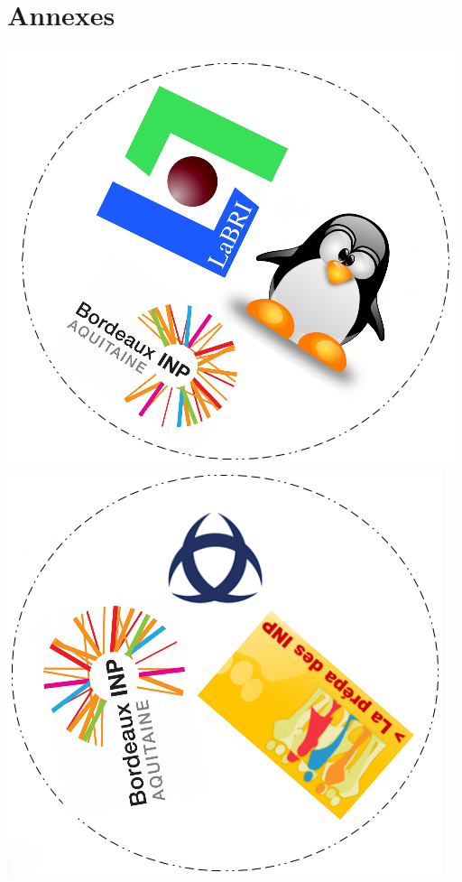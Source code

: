 \documentclass[a4paper]{article}
\begin{document}
\section*{Annexes}
\includegraphics[scale=0.43]{dobble1.png}
\includegraphics[scale=0.43]{dobble2.png}\\
\end{document}
